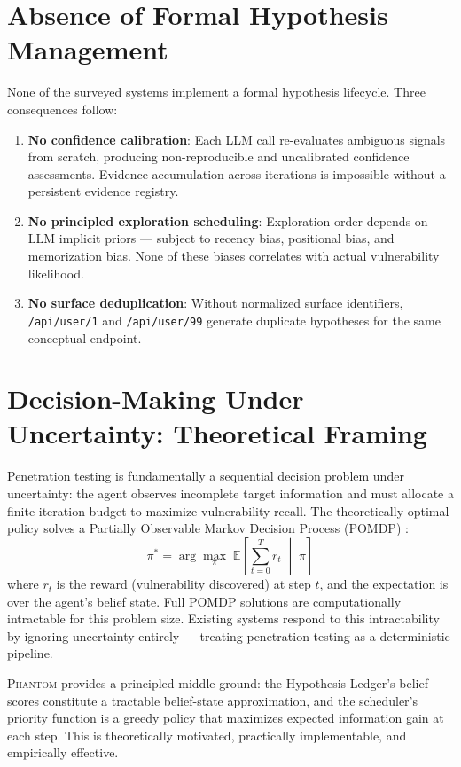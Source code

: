 \documentclass[12pt,a4paper,oneside,openany]{book}
\newcommand{\Phantom}{\textsc{Phantom}}
\begin{document}
\section{Absence of Formal Hypothesis Management}

None of the surveyed systems implement a formal hypothesis lifecycle. Three consequences follow:

\begin{enumerate}
\item \textbf{No confidence calibration}: Each LLM call re-evaluates ambiguous signals from scratch, producing non-reproducible and uncalibrated confidence assessments. Evidence accumulation across iterations is impossible without a persistent evidence registry.
\item \textbf{No principled exploration scheduling}: Exploration order depends on LLM implicit priors — subject to recency bias, positional bias, and memorization bias. None of these biases correlates with actual vulnerability likelihood.
\item \textbf{No surface deduplication}: Without normalized surface identifiers, \texttt{/api/user/1} and \texttt{/api/user/99} generate duplicate hypotheses for the same conceptual endpoint.
\end{enumerate}

\section{Decision-Making Under Uncertainty: Theoretical Framing}

Penetration testing is fundamentally a sequential decision problem under uncertainty: the agent observes incomplete target information and must allocate a finite iteration budget to maximize vulnerability recall. The theoretically optimal policy solves a Partially Observable Markov Decision Process (POMDP) \cite{kaelbling1998planning}:
\[
\pi^* = \arg\max_\pi \;\mathbb{E}\!\left[\sum_{t=0}^{T} r_t \;\middle|\; \pi\right]
\]
where $r_t$ is the reward (vulnerability discovered) at step $t$, and the expectation is over the agent's belief state. Full POMDP solutions are computationally intractable for this problem size. Existing systems respond to this intractability by ignoring uncertainty entirely — treating penetration testing as a deterministic pipeline.

\Phantom{} provides a principled middle ground: the Hypothesis Ledger's belief scores constitute a tractable belief-state approximation, and the scheduler's priority function is a greedy policy that maximizes expected information gain at each step. This is theoretically motivated, practically implementable, and empirically effective.
\end{document}
